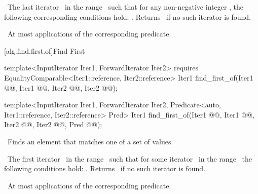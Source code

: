 \documentclass[american,twoside]{book}
\begin{document}
\begin{paras}
\begin{itemdescr}
\pnum
\textcolor{black}{}\returns\ 
The last iterator
\
in the range \
such that for any non-negative integer
,
the following corresponding conditions hold:
.
Returns \farg{last1}\
if no such iterator is found.

\pnum
\complexity\ 
At most
applications of the corresponding predicate.
\end{itemdescr}

\rSec2[alg.find.first.of]{Find First}


%
\color{addclr}\begin{itemdecl}
template<InputIterator Iter1, ForwardIterator Iter2>
  requires EqualityComparable<Iter1::reference, Iter2::reference>
  Iter1 find_first_of(Iter1 @@, Iter1 @@,
                      Iter2 @@, Iter2 @@);

template<InputIterator Iter1, ForwardIterator Iter2,
         Predicate<auto, Iter1::reference, Iter2::reference> Pred>
  Iter1 find_first_of(Iter1 @\farg{first1}@, Iter1 @\farg{last1}@,
                      Iter2 @\farg{first2}@, Iter2 @\farg{last2}@,
                      Pred @@);
\end{itemdecl}\color{black}

\begin{itemdescr}
\pnum
\effects\ 
Finds an element that matches one of a set of values.

\pnum
\returns\ 
The first iterator
\
in the range \
such that for some
iterator
\tcode{j}\
in the range \
the following conditions hold:
.
Returns \
if no such iterator is found.

\pnum
\complexity\ 
At most
applications of the corresponding predicate.
\end{itemdescr}


\end{paras}
\end{document}
